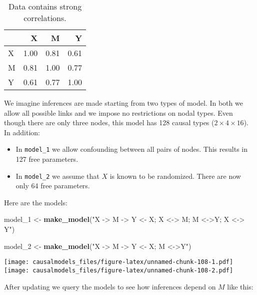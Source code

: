 \documentclass[
  12pt,
]{book}
\newenvironment{Shaded}{\begin{snugshade}}{\end{snugshade}}
\newcommand{\FunctionTok}[1]{\textcolor[rgb]{0.13,0.29,0.53}{\textbf{#1}}}
\newcommand{\NormalTok}[1]{#1}
\newcommand{\OtherTok}[1]{\textcolor[rgb]{0.56,0.35,0.01}{#1}}
\newcommand{\StringTok}[1]{\textcolor[rgb]{0.31,0.60,0.02}{#1}}
\begin{document}
\begin{table}

\caption{\label{tab:unnamed-chunk-107}Data contains strong correlations.}
\centering
\begin{tabular}[t]{l|r|r|r}
\hline
  & X & M & Y\\
\hline
X & 1.00 & 0.81 & 0.61\\
\hline
M & 0.81 & 1.00 & 0.77\\
\hline
Y & 0.61 & 0.77 & 1.00\\
\hline
\end{tabular}
\end{table}

We imagine inferences are made starting from two types of model. In both we allow all possible links and we impose no restrictions on nodal types. Even though there are only three nodes, this model has 128 causal types (\(2\times 4 \times 16\)). In addition:

\begin{itemize}
\item
  In \texttt{model\_1} we allow confounding between all pairs of nodes. This results in 127 free parameters.
\item
  In \texttt{model\_2} we assume that \(X\) is known to be randomized. There are now only 64 free parameters.
\end{itemize}

Here are the models:

\begin{Shaded}
\begin{Highlighting}[]
\NormalTok{model\_1 }\OtherTok{\textless{}{-}} 
  \FunctionTok{make\_model}\NormalTok{(}\StringTok{"X {-}\textgreater{} M {-}\textgreater{} Y \textless{}{-} X; X \textless{}{-}\textgreater{} M; M \textless{}{-}\textgreater{}Y; X \textless{}{-}\textgreater{} Y"}\NormalTok{) }

\NormalTok{model\_2 }\OtherTok{\textless{}{-}} 
  \FunctionTok{make\_model}\NormalTok{(}\StringTok{"X {-}\textgreater{} M {-}\textgreater{} Y \textless{}{-} X; M \textless{}{-}\textgreater{}Y"}\NormalTok{) }
\end{Highlighting}
\end{Shaded}

\texttt{[image: causalmodels\_files/figure-latex/unnamed-chunk-108-1.pdf]} \texttt{[image: causalmodels\_files/figure-latex/unnamed-chunk-108-2.pdf]}

After updating we query the models to see how inferences depend on \(M\) like this:
\end{document}
